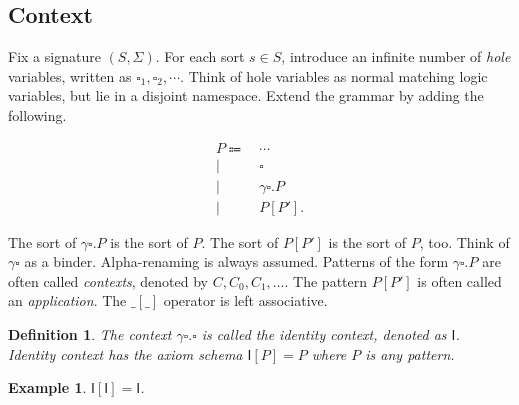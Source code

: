 \documentclass{article}
\theoremstyle{plain}
\newtheorem{defn}[thm]{Definition}
\newtheorem{eg}[thm]{Example}
\def\I{\textsf{I}}
\begin{document}
\subsection{Context}

Fix a signature $(S, \Sigma)$. For each sort $s \in S$, introduce an infinite number of \emph{hole} variables, written as $\square_1, \square_2, \cdots$. Think of hole variables as normal matching logic variables, but lie in a disjoint namespace. Extend the grammar by adding the following.

\begin{align}
\label{ml_grammar}
P \Coloneqq\  & \cdots \nonumber \\
\mid\  & \square \nonumber \\
\mid\  & \gamma \square . P \nonumber \\
\mid\  & P[P'] . \nonumber
\end{align}

The sort of $\gamma \square . P$ is the sort of $P$. The sort of $P[P']$ is the sort of $P$, too. Think of $\gamma \square$ as a binder. Alpha-renaming is always assumed. Patterns of the form $\gamma \square . P$ are often called \emph{contexts}, denoted by $C, C_0, C_1, \dots$. The pattern $P[P']$ is often called an \emph{application}. The $\_[\_]$ operator is left associative.

\begin{defn}
	The context $\gamma \square . \square$ is called the identity context, denoted as $\I$. Identity context has the axiom schema $\I[P]=P$ where $P$ is any pattern.
\end{defn}

\begin{eg}
	$\I[\I] = \I$.
\end{eg}
\end{document}
